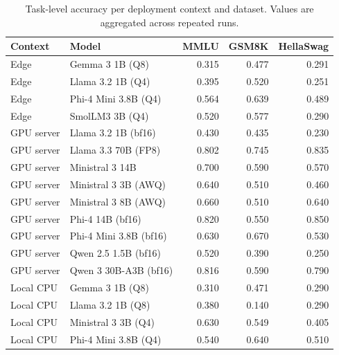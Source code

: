 \begin{table}[t]
\centering
\caption{Task-level accuracy per deployment context and dataset. Values are aggregated across repeated runs.}
\label{tab:task-accuracy}
\scriptsize
\setlength{\tabcolsep}{3.2pt}
\renewcommand{\arraystretch}{1.08}
\begin{tabularx}{\textwidth}{@{}lLrrr@{}}
\toprule
\textbf{Context} & \textbf{Model} & \textbf{MMLU} & \textbf{GSM8K} & \textbf{HellaSwag} \\
\midrule
Edge & Gemma 3 1B (Q8) & 0.315 & 0.477 & 0.291 \\
Edge & Llama 3.2 1B (Q4) & 0.395 & 0.520 & 0.251 \\
Edge & Phi-4 Mini 3.8B (Q4) & 0.564 & 0.639 & 0.489 \\
Edge & SmolLM3 3B (Q4) & 0.520 & 0.577 & 0.290 \\
GPU server & Llama 3.2 1B (bf16) & 0.430 & 0.435 & 0.230 \\
GPU server & Llama 3.3 70B (FP8) & 0.802 & 0.745 & 0.835 \\
GPU server & Ministral 3 14B & 0.700 & 0.590 & 0.570 \\
GPU server & Ministral 3 3B (AWQ) & 0.640 & 0.510 & 0.460 \\
GPU server & Ministral 3 8B (AWQ) & 0.660 & 0.510 & 0.640 \\
GPU server & Phi-4 14B (bf16) & 0.820 & 0.550 & 0.850 \\
GPU server & Phi-4 Mini 3.8B (bf16) & 0.630 & 0.670 & 0.530 \\
GPU server & Qwen 2.5 1.5B (bf16) & 0.520 & 0.390 & 0.250 \\
GPU server & Qwen 3 30B-A3B (bf16) & 0.816 & 0.590 & 0.790 \\
Local CPU & Gemma 3 1B (Q8) & 0.310 & 0.471 & 0.290 \\
Local CPU & Llama 3.2 1B (Q8) & 0.380 & 0.140 & 0.290 \\
Local CPU & Ministral 3 3B (Q4) & 0.630 & 0.549 & 0.405 \\
Local CPU & Phi-4 Mini 3.8B (Q4) & 0.540 & 0.640 & 0.510 \\
\bottomrule
\end{tabularx}
\end{table}
